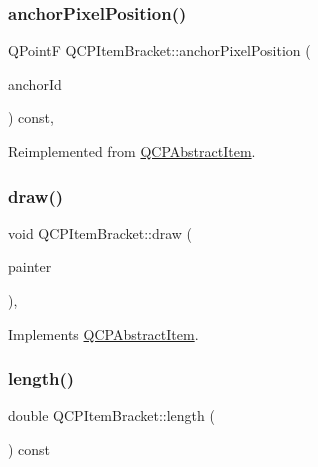 \subsubsection{\texorpdfstring{anchorPixelPosition()}{anchorPixelPosition()}}
{\footnotesize\ttfamily Q\+PointF Q\+C\+P\+Item\+Bracket\+::anchor\+Pixel\+Position (\begin{DoxyParamCaption}\item[{int}]{anchor\+Id }\end{DoxyParamCaption}) const\hspace{0.3cm}{\ttfamily [protected]}, {\ttfamily [virtual]}}



Reimplemented from \mbox{\hyperlink{class_q_c_p_abstract_item_ada5bad4e1196c4fc0d0d12328e24b8f2}{Q\+C\+P\+Abstract\+Item}}.

\mbox{\label{class_q_c_p_item_bracket_a942a3978aea44a2fc7b4383f2bf6d417}} 
\subsubsection{\texorpdfstring{draw()}{draw()}}
{\footnotesize\ttfamily void Q\+C\+P\+Item\+Bracket\+::draw (\begin{DoxyParamCaption}\item[{\mbox{\hyperlink{class_q_c_p_painter}{Q\+C\+P\+Painter}} $\ast$}]{painter }\end{DoxyParamCaption})\hspace{0.3cm}{\ttfamily [protected]}, {\ttfamily [virtual]}}



Implements \mbox{\hyperlink{class_q_c_p_abstract_item_a007fdab79c935a5da5aa04a21d268c18}{Q\+C\+P\+Abstract\+Item}}.

\mbox{\label{class_q_c_p_item_bracket_af69dbe7ca5847f36403e1fb502e8e59d}} 
\subsubsection{\texorpdfstring{length()}{length()}}
{\footnotesize\ttfamily double Q\+C\+P\+Item\+Bracket\+::length (\begin{DoxyParamCaption}{ }\end{DoxyParamCaption}) const\hspace{0.3cm}{\ttfamily [inline]}}

